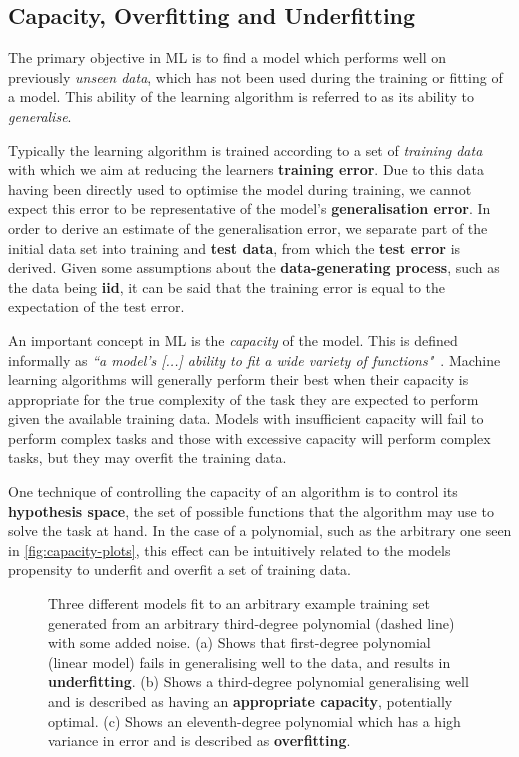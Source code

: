 \subsection{Capacity, Overfitting and Underfitting}
The primary objective in \gls{ML} is to find a model which performs well on
previously \textit{unseen data}, which has not been used during the training or
fitting of a model. This ability of the learning algorithm is referred to as its
ability to \textit{generalise}.

Typically the learning algorithm is trained according to a set of
\textit{training data} with which we aim at reducing the learners
\textbf{training error}. Due to this data having been directly used to optimise
the model during training, we cannot expect this error to be representative of
the model's \textbf{generalisation error}. In order to derive an estimate of the
generalisation error, we separate part of the initial data set into training and
\textbf{test data}, from which the \textbf{test error} is derived. Given some
assumptions about the \textbf{data-generating process}, such as the data being
\textbf{\gls{iid}}, it can be said that the training error is equal to the
expectation of the test error.

An important concept in \gls{ML} is the \textit{capacity} of the model. This is
defined informally as \textit{``a model’s [...] ability to fit a wide
variety of functions"}~\cite[p.~111-112]{Goodfellow-et-al-2016}. Machine learning
algorithms will generally perform their best when their capacity is appropriate
for the true complexity of the task they are expected to perform given the
available training data. Models with insufficient capacity will fail to perform
complex tasks and those with excessive capacity will perform complex tasks, but
they may overfit the training data.

One technique of controlling the capacity of an algorithm is to control its
\textbf{hypothesis space}, the set of possible functions that the algorithm may
use to solve the task at hand. In the case of a polynomial, such as the
arbitrary one seen in \autoref{fig:capacity-plots}, this effect can be
intuitively related to the models propensity to underfit and overfit a set of
training data.

\begin{figure}[htp]
    \centering
    
    \captionsetup{format=hang} %
    \caption{
        Three different models fit to an arbitrary example training set
        generated from an arbitrary third-degree polynomial (dashed line) with
        some added noise. (a) Shows that first-degree polynomial (linear model)
        fails in generalising well to the data, and results in
        \textbf{underfitting}. (b) Shows a third-degree polynomial generalising
        well and is described as having an \textbf{appropriate capacity},
        potentially optimal. (c) Shows an eleventh-degree polynomial which has a
        high variance in error and is described as \textbf{overfitting}.
    }
    \label{fig:capacity-plots}
\end{figure}

